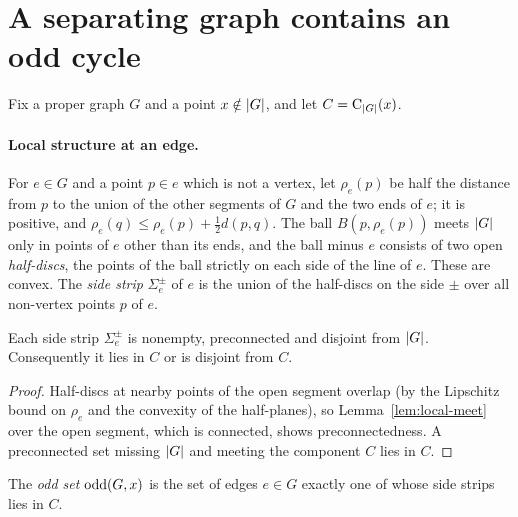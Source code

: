 
\section{A separating graph contains an odd cycle}

Fix a proper graph $G$ and a point $x\notin\lvert G\rvert$, and let $C=\operatorname{C}_{\lvert G\rvert}(x)$.

\paragraph{Local structure at an edge.} For $e\in G$ and a point $p\in e$ which is not a vertex, let
$\rho_e(p)$ be half the distance from $p$ to the union of the other segments of $G$ and the two ends
of $e$; it is positive, and $\rho_e(q)\le\rho_e(p)+\frac12d(p,q)$. The ball $B(p,\rho_e(p))$ meets
$\lvert G\rvert$ only in points of $e$ other than its ends, and the ball minus $e$ consists of two open
\emph{half-discs}, the points of the ball strictly on each side of the line of $e$. These are convex.
The \emph{side strip} $\Sigma_e^\pm$ of $e$ is the union of the half-discs on the side $\pm$ over all
non-vertex points $p$ of $e$.

\begin{lemma}\label{lem:side-strip}
Each side strip $\Sigma^\pm_e$ is nonempty, preconnected and disjoint from $\lvert G\rvert$. Consequently it
lies in $C$ or is disjoint from $C$.
\end{lemma}

\begin{proof}
Half-discs at nearby points of the open segment overlap (by the Lipschitz bound on $\rho_e$ and the
convexity of the half-planes), so Lemma~\ref{lem:local-meet} over the open segment, which is
connected, shows preconnectedness. A preconnected set missing $\lvert G\rvert$ and meeting the component $C$
lies in $C$.
\end{proof}


\begin{definition}
The \emph{odd set} $\operatorname{odd}(G,x)$ is the set of edges $e\in G$ exactly one of whose side strips lies in
$C$.
\end{definition}

